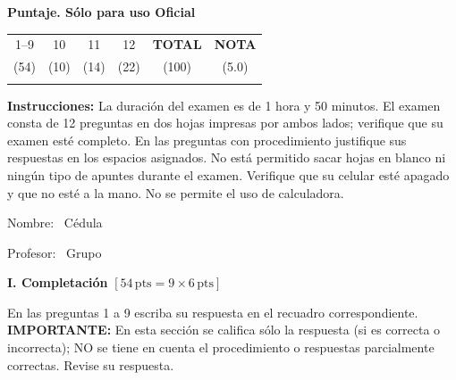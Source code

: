\documentclass[11pt]{article}
\begin{document}
\examheader

\vspace{4pt}
\noindent
\begin{minipage}[t]{0.62\linewidth}
\textbf{Puntaje. Sólo para uso Oficial}\\[4pt]
\begin{tabular}{|c|c|c|c|c|c|}
\hline
1--9 & 10 & 11 & 12 & \textbf{TOTAL} & \textbf{NOTA} \\
(54) & (10) & (14) & (22) & (100) & (5.0) \\ \hline
 & & & & & \\ \hline
\end{tabular}
\end{minipage}

\vspace{6pt}
\noindent\textbf{Instrucciones:} La duración del examen es de 1 hora y 50 minutos. El examen consta de 12 preguntas en dos hojas impresas por ambos lados; verifique que su examen esté completo. En las preguntas con procedimiento justifique sus respuestas en los espacios asignados. No está permitido sacar hojas en blanco ni ningún tipo de apuntes durante el examen. Verifique que su celular esté apagado y que no esté a la mano. No se permite el uso de calculadora.

\vspace{8pt}
\noindent Nombre: \dotfill\ Cédula \dotfill

\vspace{4pt}
\noindent Profesor: \dotfill\ Grupo \dotfill

\vspace{8pt}

\newpage
\noindent\textbf{\large I. Completación} $[54\,\mathrm{pts} = 9\times 6\,\mathrm{pts}]$

\vspace{4pt}
\noindent En las preguntas 1 a 9 escriba su respuesta en el recuadro correspondiente. \textbf{IMPORTANTE:} En esta sección se califica sólo la respuesta (si es correcta o incorrecta); NO se tiene en cuenta el procedimiento o respuestas parcialmente correctas. Revise su respuesta.
\end{document}
